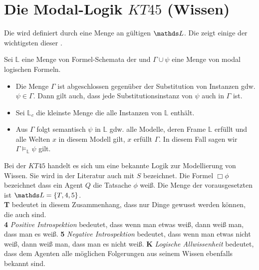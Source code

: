 

\section{Die Modal-Logik $KT45$ (Wissen)} %
\label{sub:the_normal_modal_logic_s5_}

Die \ML wird definiert durch eine Menge an gültigen \formelSchemata $\Menge{L}$.
Die  zeigt einige der wichtigsten dieser \formelSchemata.

\begin{definition}
	\label{def:substitution}
	Sei $\mathds{L}$ eine Menge von Formel-Schemata der \ML und $\Gamma \cup {\psi}$ eine Menge von modal logischen Formeln.
	
	\begin{itemize}
		\item Die Menge $\Gamma$ ist abgeschlossen gegenüber der Substitution von Instanzen gdw.  $\psi \in \Gamma$. 
		Dann gilt auch, dass jede Substitutionsinstanz von $\psi$ auch in $\Gamma$ ist.
		\item Sei $\mathds{L}_c$ die kleinste Menge die alle Instanzen von $\mathds{L}$ enthält.
		\item Aus $\Gamma$ folgt semantisch $\psi$ in $\mathds{L}$ gdw. alle Modelle, deren Frame $\mathds{L}$ erfüllt und alle Welten $x$ in diesem Modell gilt, $x$ erfüllt $\Gamma$.
		In diesem Fall sagen wir $\Gamma \vDash_{\mathds{L}} \psi$ gilt.
	\end{itemize}
	\cite[S.326]{huth2004logic}
\end{definition}

Bei der \ML $KT45$ handelt es sich um eine bekannte Logik zur Modellierung von Wissen.
Sie wird in der Literatur auch mit $S$ bezeichnet.
Die Formel $\Box \phi$ bezeichnet dass ein Agent $Q$ die Tatsache $\phi$ weiß.
Die Menge der vorausgesetzten \formelSchemata ist $\Menge{L} = \{T, 4, 5\}$.\\
\textbf{T} bedeutet in diesem Zusammenhang, dass nur Dinge gewusst werden können, die auch \true sind.\\
\textbf{4} \emph{Positive Introspektion} bedeutet, dass wenn man etwas weiß, dann weiß man, dass man es weiß.
\textbf{5} \emph{Negative Introspektion} bedeutet, dass wenn man etwas nicht weiß, dann weiß man, dass man es nicht weiß.
\textbf{K} \emph{Logische Allwissenheit} bedeutet, dass dem Agenten alle möglichen Folgerungen aus seinem Wissen ebenfalls bekannt sind.


